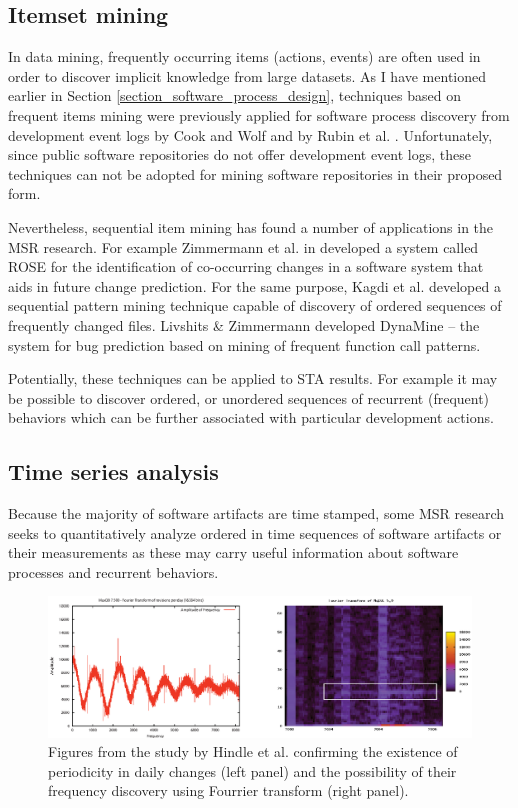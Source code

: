 \subsection{Itemset mining}
In data mining, frequently occurring items (actions, events) are often used in order to discover implicit knowledge from
large datasets. As I have mentioned earlier in Section \ref{section_software_process_design}, techniques based on frequent
items mining were previously applied for software process discovery from development event logs 
by Cook and Wolf \cite{citeulike:328044} \cite{citeulike:5120757} \cite{citeulike:5128143} 
and by Rubin et al. \cite{citeulike:1885717}. Unfortunately, since public software repositories do not offer 
development event logs, these techniques can not be adopted for mining software repositories in their proposed form.

Nevertheless, sequential item mining has found a number of applications in the MSR research.
For example Zimmermann et al. in \cite{citeulike:277045} developed a system called ROSE for the identification of 
co-occurring changes in a software system that aids in future change prediction. 
For the same purpose, Kagdi et al. \cite{citeulike:3929070} developed a sequential pattern mining technique capable of 
discovery of ordered sequences of frequently changed files. 
Livshits \& Zimmermann \cite{citeulike:393158} developed DynaMine -- the system for bug prediction based on mining 
of frequent function call patterns.

Potentially, these techniques can be applied to STA results. For example it may be possible to discover ordered, or
unordered sequences of recurrent (frequent) behaviors which can be further associated with particular development actions.

\subsection{Time series analysis}\label{chapter2_section-tsanalysis}
Because the majority of software artifacts are time stamped, some MSR research seeks to quantitatively analyze ordered 
in time sequences of software artifacts or their measurements as these may carry useful information about software 
processes and recurrent behaviors. 

\begin{figure}[t!]
   \centering
   \includegraphics[width=145mm]{figures/FourrierMySQL.eps}
   \caption{Figures from the study by Hindle et al. \cite{citeulike:10377345} confirming the existence of periodicity
   in daily changes (left panel) and the possibility of their frequency discovery using Fourrier transform (right panel).   
   }
   \label{fig:mysql-fourrier}
\end{figure}

